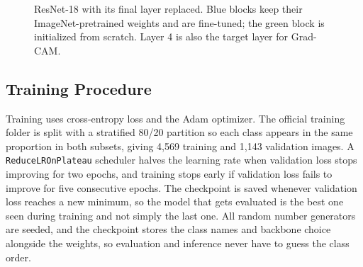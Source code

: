 \documentclass[twocolumn]{article}
\begin{document}
\begin{figure}[H]
\centering
{}
\caption{ResNet-18 with its final layer replaced. Blue blocks keep their ImageNet-pretrained weights and are fine-tuned; the green block is initialized from scratch. Layer 4 is also the target layer for Grad-CAM.}
\label{fig:architecture}
\end{figure}

\subsection{Training Procedure}
Training uses cross-entropy loss and the Adam optimizer. The official training folder is split with a stratified 80/20 partition so each class appears in the same proportion in both subsets, giving 4,569 training and 1,143 validation images. A \texttt{ReduceLROnPlateau} scheduler halves the learning rate when validation loss stops improving for two epochs, and training stops early if validation loss fails to improve for five consecutive epochs. The checkpoint is saved whenever validation loss reaches a new minimum, so the model that gets evaluated is the best one seen during training and not simply the last one. All random number generators are seeded, and the checkpoint stores the class names and backbone choice alongside the weights, so evaluation and inference never have to guess the class order.
\end{document}
